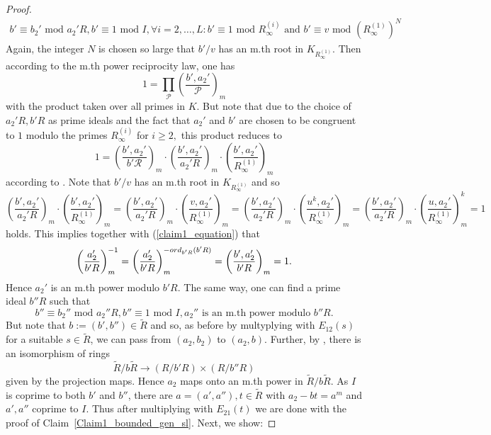 \documentclass[12pt]{amsart}
\newcommand{\C}[1]{{\mathcal #1}}
\theoremstyle{definition}\newtheorem{definition}[theorem]{Definition}
\theoremstyle{remark}\newtheorem{remark}[theorem]{Remark}
\theoremstyle{definition}\newtheorem{case}{Case}
\begin{document}
\begin{proof}
\begin{align*}
b'\equiv b_2'\text{ mod }a_2'R,b'\equiv 1\text{ mod }I,\forall i=2,\dots,L:b'\equiv 1\text{ mod }R_{\infty}^{(i)}\text{ and }b'\equiv v\text{ mod }(R_{\infty}^{(1)})^N
\end{align*}
Again, the integer $N$ is chosen so large that $b'/v$ has an m.th root in $K_{R_{\infty}^{(1)}}.$ Then according to the m.th power reciprocity law, one has
\begin{equation*}
1=\prod_{\C P} \left(\frac{b',a_2'}{\C P}\right)_m
\end{equation*}
with the product taken over all primes in $K.$ But note that due to the choice of $a_2'R,b'R$ as prime ideals and the fact that $a_2'$ and $b'$ are chosen to be congruent to $1$ modulo the primes $R_{\infty}^{(i)}$ for $i\geq 2,$ this product reduces to 
\begin{equation}\label{claim1_equation}
1=\left(\frac{b',a_2'}{b'\C R}\right)_m\cdot\left(\frac{b',a_2'}{a_2'R}\right)_m\cdot\left(\frac{b',a_2'}{R_{\infty}^{(1)}}\right)_m
\end{equation} 
according to \cite[A16]{MR244257}. Note that $b'/v$ has an m.th root in $K_{R_{\infty}^{(1)}}$ and so
\begin{equation*}
\left(\frac{b',a_2'}{a_2'R}\right)_m\cdot\left(\frac{b',a_2'}{R_{\infty}^{(1)}}\right)_m=
\left(\frac{b',a_2'}{a_2'R}\right)_m\cdot\left(\frac{v,a_2'}{R_{\infty}^{(1)}}\right)_m=
\left(\frac{b',a_2'}{a_2'R}\right)_m\cdot\left(\frac{u^k,a_2'}{R_{\infty}^{(1)}}\right)_m=
\left(\frac{b',a_2'}{a_2'R}\right)_m\cdot\left(\frac{u,a_2'}{R_{\infty}^{(1)}}\right)_m^k=1
\end{equation*} 
holds. This implies together with (\ref{claim1_equation}) that
\begin{equation*}
\left(\frac{a_2'}{b'R}\right)_m^{-1}=\left(\frac{a_2'}{b'R}\right)_m^{-{\rm ord}_{b'R}(b'R)}=\left(\frac{b',a_2'}{b'R}\right)_m=1.
\end{equation*}
Hence $a_2'$ is an m.th power modulo $b'R$. The same way, one can find a prime ideal $b''R$ such that 
\[
b''\equiv b_2''\text{ mod }a_2''R,b''\equiv 1\text{ mod }I,a_2''\text{ is an m.th power modulo }b''R.
\]
But note that $b:=(b',b'')\in\tilde{R}$ and so, as before by multyplying with $E_{12}(s)$ for a suitable $s\in\tilde{R}$, we can pass from $(a_2,b_2)$ to $(a_2,b).$ Further, by \cite[Lemma~2.1]{gvozdevsky2023width}, there is an isomorphism of rings
\[
\tilde{R}/b\tilde{R}\to (R/b'R)\times(R/b''R)
\]
given by the projection maps. Hence $a_2$ maps onto an m.th power in $\tilde{R}/b\tilde{R}$. As $I$ is coprime to both $b'$ and $b''$, there are $a=(a',a''),t\in\tilde{R}$ with $a_2-bt=a^m$ and $a',a''$ coprime to $I.$ Thus after multiplying with $E_{21}(t)$ we are done with the proof of Claim~\ref{Claim1_bounded_gen_sl}. Next, we show:


\end{proof}
\end{document}
